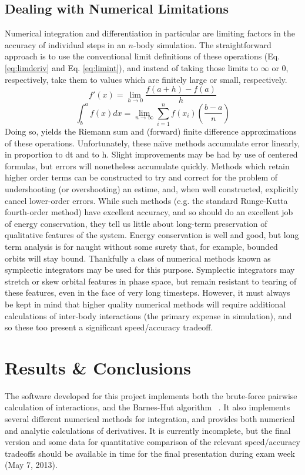 \documentclass[10pt,twocolumn]{article}
\begin{document}
	\subsection{Dealing with Numerical Limitations}
	\label{sec:numerical}
	Numerical integration and differentiation in particular are limiting factors in the accuracy of individual steps in an $n$-body simulation.
	The straightforward approach is to use the conventional limit definitions of these operations (Eq. \ref{eq:limderiv} and Eq. \ref{eq:limint}), and instead of taking those limits
	to $\infty$ or $0$, respectively, take them to values which are finitely large or small, respectively.
	\begin{equation}
	\label{eq:limderiv}
	f'(x) = \lim_{h \to 0} \frac{f(a+h)-f(a)}{h}
	\end{equation}
	\begin{equation}
	\label{eq:limint}
	\int^{a}_{b} f(x) dx = \lim_{n \to \infty} \sum^{n}_{i=1} f(x_{i})\left(\frac{b-a}{n}\right)
	\end{equation}
	Doing so, yields the Riemann sum and (forward) finite difference approximations of these operations. Unfortunately, these na\"\i ve methods
	accumulate error linearly, in proportion to dt and to h. Slight improvements may be had by use of centered formulas, but errors will nonetheless
	accumulate quickly. Methods which retain higher order terms can be constructed to try and correct for the problem of undershooting
	(or overshooting) an estime, and, when well constructed, explicitly cancel lower-order errors. While such methods (e.g.
	the standard Runge-Kutta fourth-order method) have excellent accuracy, and so should do an excellent job of energy conservation,
	they tell us little about long-term preservation of qualitative features of the system. Energy conservation is well and good,
	but long term analysis is for naught without some surety that, for example, bounded orbits will stay bound. Thankfully a class of numerical
	methods known as symplectic integrators may be used for this purpose. Symplectic integrators may stretch or skew orbital features in phase space,
	but remain resistant to tearing of these features, even in the face of very long timesteps. However, it must always be kept in mind that
	higher quality numerical methods will require additional calculations of inter-body interactions (the primary expense in simulation), and so
	these too present a significant speed/accuracy tradeoff.
	
	\section{Results \& Conclusions}
	\label{sec:conclusion}
	The software developed for this project implements both the brute-force pairwise calculation of interactions, and the Barnes-Hut algorithm ~\cite{GravSim}.
	It also implements several different numerical methods for integration, and provides both numerical and analytic calculations of derivatives.
	It is currently incomplete, but the final version and some data for quantitative comparison of the relevant speed/accuracy tradeoffs should
	be available in time for the final presentation during exam week (May 7, 2013).


    
    
\end{document}
